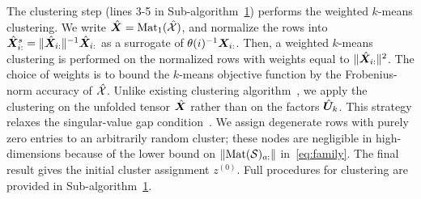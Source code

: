 \documentclass[journal]{IEEEtran}
\theoremstyle{definition}
\theoremstyle{definition}
\begin{document}
The clustering step (lines 3-5 in Sub-algorithm~\hyperref[alg:main]{1}) performs the weighted $k$-means clustering. 
We write $\hat {\bm X}=\text{Mat}_1(\hat {\mathcal{X}})$, and normalize the rows into $\hat {\bm X}^s_{i:}=\lVert\hat {\bm X}_{i:}\rVert^{-1}\hat {\bm X}_{i:}$ as a surrogate of $\theta(i)^{-1} \bm X_{i:}$. Then, a weighted $k$-means clustering is performed on the normalized rows with weights equal to $\lVert\hat {\bm X}_{i:}\rVert^2$. The choice of weights is to bound the $k$-means objective function by the Frobenius-norm accuracy of $\hat {\mathcal{X}}$. Unlike existing clustering algorithm~\citep{ke2019community}, we apply the clustering on the unfolded tensor $\hat {\bm X}$ rather than on the factors $\hat {\bm{U}}_k$. This strategy relaxes the singular-value gap condition~\citep{gao2018community, han2020exact}.
We assign degenerate rows with purely zero entries to an arbitrarily random cluster; these nodes are negligible in high-dimensions because of the lower bound on $\lVert\text{Mat}(\mathcal{S})_{a:}\rVert$ in~\eqref{eq:family}. The final result gives the initial cluster assignment $z^{(0)}$. Full procedures for clustering are provided in Sub-algorithm~\hyperref[alg:main]{1}. 
\end{document}
